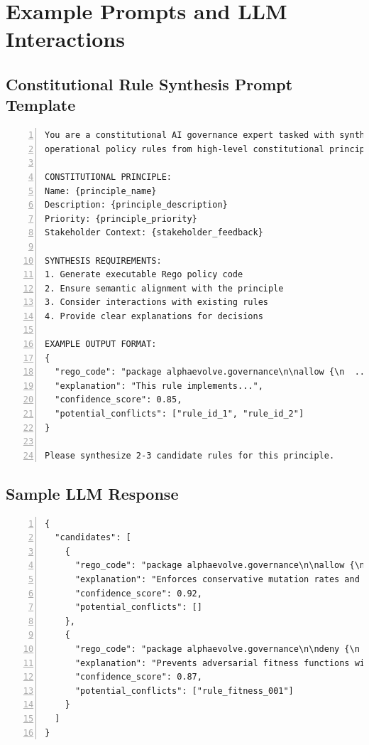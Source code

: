 \documentclass[sigconf,natbib]{acmart}
\begin{document}
\section{Example Prompts and LLM Interactions}
\label{app:example_prompts}

\subsection{Constitutional Rule Synthesis Prompt Template}
\begin{lstlisting}[language=text, caption=LLM prompt template for constitutional rule synthesis., label=lst:synthesis_prompt, numbers=left, basicstyle=\ttfamily\scriptsize]
You are a constitutional AI governance expert tasked with synthesizing
operational policy rules from high-level constitutional principles.

CONSTITUTIONAL PRINCIPLE:
Name: {principle_name}
Description: {principle_description}
Priority: {principle_priority}
Stakeholder Context: {stakeholder_feedback}

SYNTHESIS REQUIREMENTS:
1. Generate executable Rego policy code
2. Ensure semantic alignment with the principle
3. Consider interactions with existing rules
4. Provide clear explanations for decisions

EXAMPLE OUTPUT FORMAT:
{
  "rego_code": "package alphaevolve.governance\n\nallow {\n  ...\n}",
  "explanation": "This rule implements...",
  "confidence_score": 0.85,
  "potential_conflicts": ["rule_id_1", "rule_id_2"]
}

Please synthesize 2-3 candidate rules for this principle.
\end{lstlisting}

\subsection{Sample LLM Response}
\begin{lstlisting}[language=text, caption=Example LLM response for safety principle synthesis., label=lst:llm_response_example, numbers=left, basicstyle=\ttfamily\scriptsize]
{
  "candidates": [
    {
      "rego_code": "package alphaevolve.governance\n\nallow {\n  input.mutation_rate <= 0.1\n  input.population_size >= 50\n  not contains(input.operators, \"unsafe_crossover\")\n}",
      "explanation": "Enforces conservative mutation rates and population sizes while blocking unsafe genetic operators",
      "confidence_score": 0.92,
      "potential_conflicts": []
    },
    {
      "rego_code": "package alphaevolve.governance\n\ndeny {\n  input.fitness_function.type == \"adversarial\"\n  not input.safety_constraints.verified\n}",
      "explanation": "Prevents adversarial fitness functions without verified safety constraints",
      "confidence_score": 0.87,
      "potential_conflicts": ["rule_fitness_001"]
    }
  ]
}
\end{lstlisting}
\end{document}
